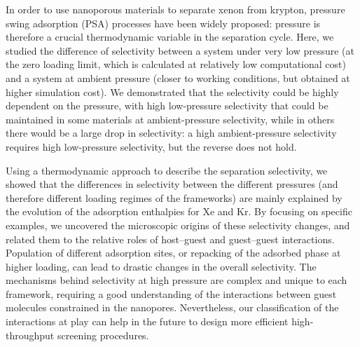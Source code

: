 \documentclass[main.tex]{subfiles}
\begin{document}
In order to use nanoporous materials to separate xenon from krypton, pressure swing adsorption (PSA) processes have been widely proposed: pressure is therefore a crucial thermodynamic variable in the separation cycle. Here, we studied the difference of selectivity between a system under very low pressure (at the zero loading limit, which is calculated at relatively low computational cost) and a system at ambient pressure (closer to working conditions, but obtained at higher simulation cost). We demonstrated that the selectivity could be highly dependent on the pressure, with high low-pressure selectivity that could be maintained in some materials at ambient-pressure selectivity, while in others there would be a large drop in selectivity: a high ambient-pressure selectivity requires high low-pressure selectivity, but the reverse does not hold.

Using a thermodynamic approach to describe the separation selectivity, we showed that the differences in selectivity between the different pressures (and therefore different loading regimes of the frameworks) are mainly explained by the evolution of the adsorption enthalpies for Xe and Kr. By focusing on specific examples, we uncovered the microscopic origins of these selectivity changes, and related them to the relative roles of host--guest and guest--guest interactions. Population of different adsorption sites, or repacking of the adsorbed phase at higher loading, can lead to drastic changes in the overall selectivity. The mechanisms behind selectivity at high pressure are complex and unique to each framework, requiring a good understanding of the interactions between guest molecules constrained in the nanopores. Nevertheless, our classification of the interactions at play can help in the future to design more efficient high-throughput screening procedures.



\OnlyInSubfile{\printglobalbibliography}
\end{document}

